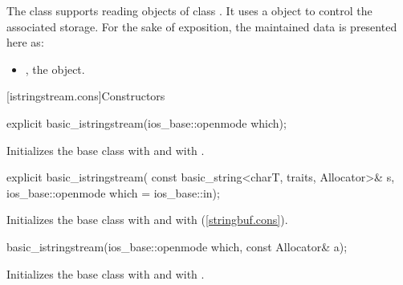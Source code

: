 \pnum
The class
supports reading objects of class
.
It uses a
object to control the associated storage.
For the sake of exposition, the maintained data is presented here as:
\begin{itemize}
\item
{}, the  object.
\end{itemize}

[istringstream.cons]{Constructors}

%
\begin{itemdecl}
explicit basic_istringstream(ios_base::openmode which);
\end{itemdecl}

\begin{itemdescr}
\pnum
\effects
Initializes the base class with
and  with
.
\end{itemdescr}

%
\begin{itemdecl}
explicit basic_istringstream(
  const basic_string<charT, traits, Allocator>& s,
  ios_base::openmode which = ios_base::in);
\end{itemdecl}

\begin{itemdescr}
\pnum
\effects
Initializes the base class with
and  with
\linebreak(\ref{stringbuf.cons}). %
\end{itemdescr}

%
\begin{itemdecl}
basic_istringstream(ios_base::openmode which, const Allocator& a);
\end{itemdecl}

\begin{itemdescr}
\pnum
\effects
Initializes the base class with
and  with
.
\end{itemdescr}


